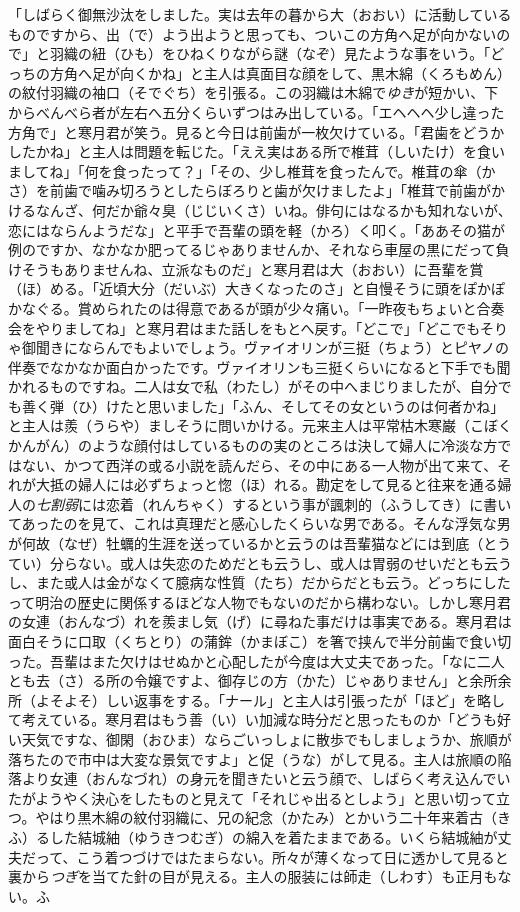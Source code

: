 \documentclass{book}
\begin{document}
「しばらく御無沙汰をしました。実は去年の暮から大（おおい）に活動しているものですから、出（で）よう出ようと思っても、ついこの方角へ足が向かないので」と羽織の紐（ひも）をひねくりながら謎（なぞ）見たような事をいう。「どっちの方角へ足が向くかね」と主人は真面目な顔をして、黒木綿（くろもめん）の紋付羽織の袖口（そでぐち）を引張る。この羽織は木綿で\emph{ゆき}が短かい、下からべんべら者が左右へ五分くらいずつはみ出している。「エヘヘヘ少し違った方角で」と寒月君が笑う。見ると今日は前歯が一枚欠けている。「君歯をどうかしたかね」と主人は問題を転じた。「ええ実はある所で椎茸（しいたけ）を食いましてね」「何を食ったって？」「その、少し椎茸を食ったんで。椎茸の傘（かさ）を前歯で噛み切ろうとしたらぼろりと歯が欠けましたよ」「椎茸で前歯がかけるなんざ、何だか爺々臭（じじいくさ）いね。俳句にはなるかも知れないが、恋にはならんようだな」と平手で吾輩の頭を軽（かろ）く叩く。「ああその猫が例のですか、なかなか肥ってるじゃありませんか、それなら車屋の黒にだって負けそうもありませんね、立派なものだ」と寒月君は大（おおい）に吾輩を賞（ほ）める。「近頃大分（だいぶ）大きくなったのさ」と自慢そうに頭をぽかぽかなぐる。賞められたのは得意であるが頭が少々痛い。「一昨夜もちょいと合奏会をやりましてね」と寒月君はまた話しをもとへ戻す。「どこで」「どこでもそりゃ御聞きにならんでもよいでしょう。ヴァイオリンが三挺（ちょう）とピヤノの伴奏でなかなか面白かったです。ヴァイオリンも三挺くらいになると下手でも聞かれるものですね。二人は女で私（わたし）がその中へまじりましたが、自分でも善く弾（ひ）けたと思いました」「ふん、そしてその女というのは何者かね」と主人は羨（うらや）ましそうに問いかける。元来主人は平常枯木寒巌（こぼくかんがん）のような顔付はしているものの実のところは決して婦人に冷淡な方ではない、かつて西洋の或る小説を読んだら、その中にある一人物が出て来て、それが大抵の婦人には必ずちょっと惚（ほ）れる。勘定をして見ると往来を通る婦人の\emph{七割弱}には恋着（れんちゃく）するという事が諷刺的（ふうしてき）に書いてあったのを見て、これは真理だと感心したくらいな男である。そんな浮気な男が何故（なぜ）牡蠣的生涯を送っているかと云うのは吾輩猫などには到底（とうてい）分らない。或人は失恋のためだとも云うし、或人は胃弱のせいだとも云うし、また或人は金がなくて臆病な性質（たち）だからだとも云う。どっちにしたって明治の歴史に関係するほどな人物でもないのだから構わない。しかし寒月君の女連（おんなづ）れを羨まし気（げ）に尋ねた事だけは事実である。寒月君は面白そうに口取（くちとり）の蒲鉾（かまぼこ）を箸で挟んで半分前歯で食い切った。吾輩はまた欠けはせぬかと心配したが今度は大丈夫であった。「なに二人とも去（さ）る所の令嬢ですよ、御存じの方（かた）じゃありません」と余所余所（よそよそ）しい返事をする。「ナール」と主人は引張ったが「ほど」を略して考えている。寒月君はもう善（い）い加減な時分だと思ったものか「どうも好い天気ですな、御閑（おひま）ならごいっしょに散歩でもしましょうか、旅順が落ちたので市中は大変な景気ですよ」と促（うな）がして見る。主人は旅順の陥落より女連（おんなづれ）の身元を聞きたいと云う顔で、しばらく考え込んでいたがようやく決心をしたものと見えて「それじゃ出るとしよう」と思い切って立つ。やはり黒木綿の紋付羽織に、兄の紀念（かたみ）とかいう二十年来着古（きふ）るした結城紬（ゆうきつむぎ）の綿入を着たままである。いくら結城紬が丈夫だって、こう着つづけではたまらない。所々が薄くなって日に透かして見ると裏から\emph{つぎ}を当てた針の目が見える。主人の服装には師走（しわす）も正月もない。ふ
\end{document}

